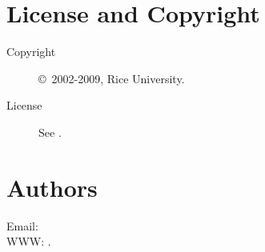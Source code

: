 \documentclass[english]{article}
\begin{document}
\section{License and Copyright}

\begin{description}
\item[Copyright] \copyright\ 2002-2009, Rice University.
\item[License] See .
\end{description}

\section{Authors}

Email:  \\
WWW: .

\LatexManEnd
\end{document}

